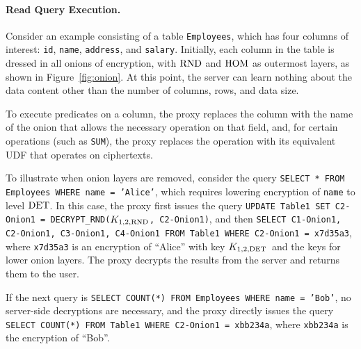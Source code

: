 \paragraph{Read Query Execution.}

Consider an example consisting of a table \texttt{Employees}, which
has four columns of interest: \texttt{id}, \texttt{name},
\texttt{address}, and {\tt salary}.  Initially, each column in the
table is dressed in all onions of encryption, with $\textrm{RND}$ and $\textrm{HOM}$
as outermost layers, as shown in Figure~\ref{fig:onion}.  At this
point, the server can learn nothing about the data content other than
the number of columns, rows, and data size.

To execute predicates on a column, the proxy replaces the column with the
name of the onion that allows the necessary operation on
that field, and, for certain operations (such as {\tt SUM}), the proxy
replaces the operation with its equivalent UDF that operates on
ciphertexts.  

To illustrate when onion layers are removed, consider the query
\texttt{SELECT * FROM Employees WHERE name = 'Alice'}, which requires
lowering encryption of {\tt name} to level $\textrm{DET}$\@.  In this case,
the proxy first issues the query \texttt{UPDATE Table1 SET C2-Onion1 =
  DECRYPT\_RND($K_{1,2,\textrm{RND}}$, C2-Onion1)}, and then \texttt{SELECT
  C1-Onion1, C2-Onion1, C3-Onion1, C4-Onion1 FROM Table1 WHERE
  C2-Onion1 = x7d35a3}, where \texttt{x7d35a3} is an encryption of
``Alice'' with key $K_{1,2,\textrm{DET}}$\ and the keys for lower onion layers.  The proxy decrypts the results
from the server and returns them to the user.

If the next query is {\tt SELECT COUNT(*) FROM Employees WHERE name =
  'Bob'}, no server-side decryptions are necessary, and the proxy
directly issues the query {\tt SELECT COUNT(*) FROM Table1 WHERE
  C2-Onion1 = xbb234a}, where \texttt{xbb234a} is the encryption of ``Bob''.



